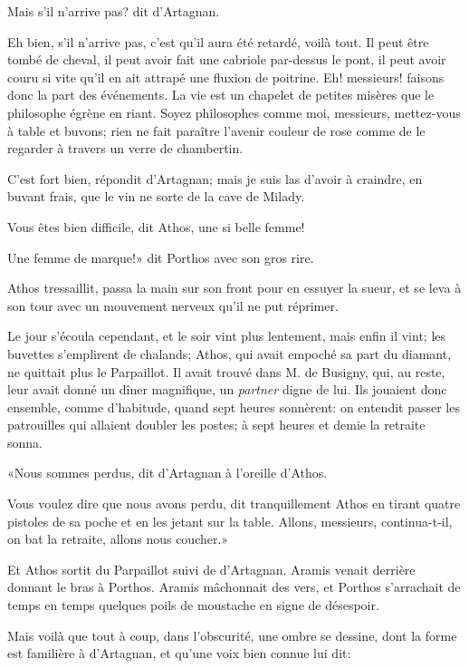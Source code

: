 \speak  Mais s'il n'arrive pas? dit d'Artagnan. 

\speak  Eh bien, s'il n'arrive pas, c'est qu'il aura été retardé, voilà tout. Il peut être tombé de cheval, il peut avoir fait une cabriole par-dessus le pont, il peut avoir couru si vite qu'il en ait attrapé une fluxion de poitrine. Eh! messieurs! faisons donc la part des événements. La vie est un chapelet de petites misères que le philosophe égrène en riant. Soyez philosophes comme moi, messieurs, mettez-vous à table et buvons; rien ne fait paraître l'avenir couleur de rose comme de le regarder à travers un verre de chambertin. 

\speak  C'est fort bien, répondit d'Artagnan; mais je suis las d'avoir à craindre, en buvant frais, que le vin ne sorte de la cave de Milady. 

\speak  Vous êtes bien difficile, dit Athos, une si belle femme! 

\speak  Une femme de marque!» dit Porthos avec son gros rire. 

Athos tressaillit, passa la main sur son front pour en essuyer la sueur, et se leva à son tour avec un mouvement nerveux qu'il ne put réprimer. 

Le jour s'écoula cependant, et le soir vint plus lentement, mais enfin il vint; les buvettes s'emplirent de chalands; Athos, qui avait empoché sa part du diamant, ne quittait plus le Parpaillot. Il avait trouvé dans M. de Busigny, qui, au reste, leur avait donné un dîner magnifique, un \textit{partner} digne de lui. Ils jouaient donc ensemble, comme d'habitude, quand sept heures sonnèrent: on entendit passer les patrouilles qui allaient doubler les postes; à sept heures et demie la retraite sonna. 

«Nous sommes perdus, dit d'Artagnan à l'oreille d'Athos. 

\speak  Vous voulez dire que nous avons perdu, dit tranquillement Athos en tirant quatre pistoles de sa poche et en les jetant sur la table. Allons, messieurs, continua-t-il, on bat la retraite, allons nous coucher.» 

Et Athos sortit du Parpaillot suivi de d'Artagnan. Aramis venait derrière donnant le bras à Porthos. Aramis mâchonnait des vers, et Porthos s'arrachait de temps en temps quelques poils de moustache en signe de désespoir. 

Mais voilà que tout à coup, dans l'obscurité, une ombre se dessine, dont la forme est familière à d'Artagnan, et qu'une voix bien connue lui dit: 

